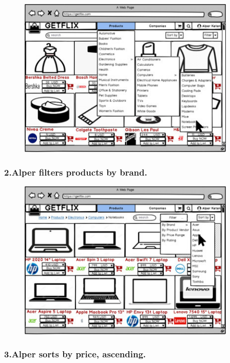 \documentclass[]{article}
\begin{document}
\begin{figure}[H]
    \centering
    \includegraphics[height=3in]{./images/26.jpg}
\end{figure}

\hypertarget{alper-filters-products-by-brand.}{%
    \subsubsection{2.Alper filters products by
        brand.}\label{alper-filters-products-by-brand.}}

\begin{figure}[H]
    \centering
    \includegraphics[height=3in]{./images/27.jpg}
\end{figure}

\hypertarget{alper-sorts-by-price-ascending.}{%
    \subsubsection{3.Alper sorts by price,
        ascending.}\label{alper-sorts-by-price-ascending.}}
\end{document}
